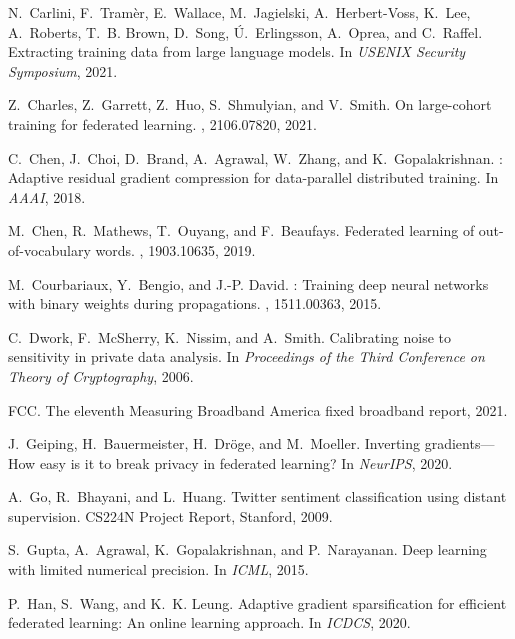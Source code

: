 \documentclass[11pt]{article}
\begin{document}
\begin{thebibliography}{10}
\begin{small}
N.~Carlini, F.~Tram{\`{e}}r, E.~Wallace, M.~Jagielski, A.~Herbert{-}Voss,
  K.~Lee, A.~Roberts, T.~B. Brown, D.~Song, {\'{U}}.~Erlingsson, A.~Oprea, and
  C.~Raffel.
\newblock Extracting training data from large language models.
\newblock In {\em {USENIX} Security Symposium}, 2021.

Z.~Charles, Z.~Garrett, Z.~Huo, S.~Shmulyian, and V.~Smith.
\newblock On large-cohort training for federated learning.
, 2106.07820, 2021.

C.~Chen, J.~Choi, D.~Brand, A.~Agrawal, W.~Zhang, and K.~Gopalakrishnan.
: Adaptive residual gradient compression for data-parallel
  distributed training.
\newblock In {\em AAAI}, 2018.

M.~Chen, R.~Mathews, T.~Ouyang, and F.~Beaufays.
\newblock Federated learning of out-of-vocabulary words.
, 1903.10635, 2019.

M.~Courbariaux, Y.~Bengio, and J.-P. David.
: Training deep neural networks with binary weights
  during propagations.
, 1511.00363, 2015.

C.~Dwork, F.~McSherry, K.~Nissim, and A.~Smith.
\newblock Calibrating noise to sensitivity in private data analysis.
\newblock In {\em Proceedings of the Third Conference on Theory of
  Cryptography}, 2006.

FCC.
\newblock The eleventh {Measuring Broadband America} fixed broadband report,
  2021.

J.~Geiping, H.~Bauermeister, H.~Dr\"{o}ge, and M.~Moeller.
\newblock Inverting gradients---{H}ow easy is it to break privacy in federated
  learning?
\newblock In {\em NeurIPS}, 2020.

A.~Go, R.~Bhayani, and L.~Huang.
\newblock Twitter sentiment classification using distant supervision.
\newblock CS224N Project Report, Stanford, 2009.

S.~Gupta, A.~Agrawal, K.~Gopalakrishnan, and P.~Narayanan.
\newblock Deep learning with limited numerical precision.
\newblock In {\em ICML}, 2015.

P.~Han, S.~Wang, and K.~K. Leung.
\newblock Adaptive gradient sparsification for efficient federated learning: An
  online learning approach.
\newblock In {\em ICDCS}, 2020.


\end{small}
\end{thebibliography}
\end{document}
